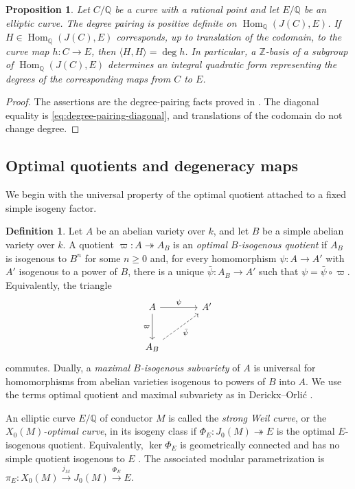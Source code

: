 \documentclass[12pt, letterpaper]{amsart}
\newtheorem{proposition}[theorem]{Proposition}
\theoremstyle{definition}
\newtheorem{definition}[theorem]{Definition}
\theoremstyle{remark}
\newcommand{\Q}{\mathbb Q}
\newcommand{\Z}{\mathbb Z}
\newcommand{\Hom}{\operatorname{Hom}}
\numberwithin{equation}{section}
\begin{document}
\begin{proposition}\label{prop:degree-pairing-basic}
Let \(C/\Q\) be a curve with a rational point and let \(E/\Q\) be an elliptic
curve. The degree pairing is positive definite on \(\Hom_\Q(J(C),E)\). If
\(H\in\Hom_\Q(J(C),E)\) corresponds, up to translation of the codomain, to the
curve map \(h:C\to E\), then \(\langle H,H\rangle=\deg h\).
In particular, a \(\Z\)-basis of a subgroup of \(\Hom_\Q(J(C),E)\) determines an
integral quadratic form representing the degrees of the corresponding maps from
\(C\) to \(E\).
\end{proposition}

\begin{proof}
The assertions are the degree-pairing facts proved in
\cite{DerickxOrlic}. The
diagonal equality is \eqref{eq:degree-pairing-diagonal}, and translations of
the codomain do not change degree.
\end{proof}

\subsection{Optimal quotients and degeneracy maps}

We begin with the universal property of the optimal quotient attached to a
fixed simple isogeny factor.

\begin{definition}\label{def:optimal-isogenous}
Let \(A\) be an abelian variety over \(k\), and let \(B\) be a simple abelian
variety over \(k\). A quotient \(\varpi:A\twoheadrightarrow A_B\) is an
\emph{optimal \(B\)-isogenous quotient} if \(A_B\) is isogenous to \(B^n\) for
some \(n\ge0\) and, for every homomorphism \(\psi:A\to A'\) with \(A'\) isogenous
to a power of \(B\), there is a unique \(\bar\psi:A_B\to A'\) such that
\(\psi=\bar\psi\circ\varpi\).
Equivalently, the triangle
\[
\begin{tikzcd}[column sep=large,row sep=large]
A \arrow[r,"\psi"] \arrow[d,"\varpi"'] & A' \\
A_B \arrow[ur,dashed,"\bar\psi"']
\end{tikzcd}
\]
commutes. Dually, a \emph{maximal \(B\)-isogenous subvariety} of \(A\) is
universal for homomorphisms from abelian varieties isogenous to powers of \(B\)
into \(A\). We use the terms optimal quotient and maximal subvariety as in
Derickx--Orli\'c \cite{DerickxOrlic}.
\end{definition}

An elliptic curve \(E/\Q\) of conductor \(M\) is called the \emph{strong Weil
curve}, or the \emph{\(X_0(M)\)-optimal curve}, in its isogeny class if
\(\Phi_E:J_0(M)\twoheadrightarrow E\) is the optimal \(E\)-isogenous quotient.
Equivalently, \(\ker\Phi_E\) is geometrically connected and has no simple quotient
isogenous to \(E\) \cite{AgasheRibetStein}. The associated modular parametrization
is \(\pi_E:X_0(M)\xrightarrow{j_M}J_0(M)\xrightarrow{\Phi_E}E\).
\end{document}
